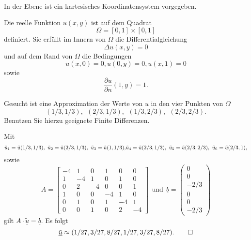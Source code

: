 In der Ebene ist ein kartesisches Koordinatensystem vorgegeben. 

Die reelle Funktion $u(x,y)$ ist auf dem Quadrat
\[
\Omega = [0,1] \times [0,1]
\]
definiert. Sie erfüllt im Innern von $\Omega$ die Differentialgleichung
\[
\Delta u(x,y) = 0
\]
und auf dem Rand von $\Omega$ die Bedingungen
\[
u(x,0) = 0, u(0,y) = 0, u(x,1) = 0
\]
sowie
\[
\frac{\partial u}{\partial n}(1,y) = 1.
\]
\vspace{2mm}

Gesucht ist eine Approximation der Werte von $u$ in den vier Punkten von
$\Omega$
\[
(1/3,1/3), \ \  (2/3,1/3), \ \ (1/3,2/3), \ \ (2/3,2/3).
\]
Benutzen Sie hierzu geeignete Finite Differenzen.

\begin{loesung}
Mit 
\[
\tilde u_1 = \tilde u(1/3,1/3), \ \tilde u_2 = \tilde u(2/3,1/3), \ \tilde u_3 = \tilde u(1,1/3),$$ $$\tilde u_4 = \tilde u(2/3,1/3), \ \tilde u_5 = \tilde u(2/3,2/3), \ \tilde u_6 = \tilde u(2/3,1),
\]
sowie 
\[
A = \left[\begin{array}{rrrrrr} 
-4 & 1 & 0 & 1 & 0 & 0\\
1 & -4 & 1 & 0 & 1 & 0 \\
0 & 2 & -4 & 0 & 0 & 1 \\ 

1 & 0 & 0 & -4 & 1 & 0 \\
0 & 1 & 0 & 1 & -4 & 1 \\
0 & 0 & 1 & 0 & 2 & -4 \end{array}\right] \ \ \text{und} \ \
\underline{b} =  \left(\begin{array}{r} 0 \\ 0 \\ -2/3 \\ 0 \\ 0 \\ -2/3 \end{array}\right) 
\]
gilt $A \cdot \underline{\tilde u} = \underline{b}.$ Es folgt 
\[
\underline{\tilde u} \approx (1/27, 3/27, 8/27, 1/27, 3/27, 8/27).
\qedhere
\]
\end{loesung}
